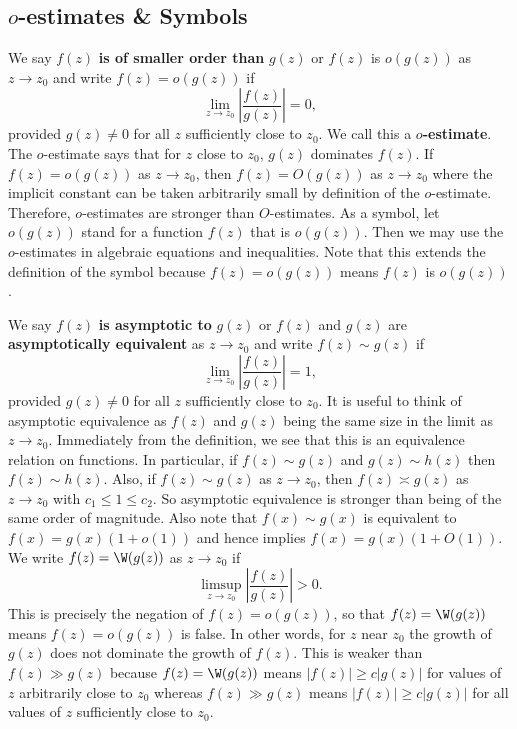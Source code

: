       \subsection*{\texorpdfstring{$o$}{o}-estimates \& Symbols}
        We say $f(z)$ \textbf{is of smaller order than} $g(z)$ or $f(z)$ is $o(g(z))$ as $z \to z_{0}$ and write $f(z) = o(g(z))$ if
        \[
          \lim_{z \to z_{0}}\left|\frac{f(z)}{g(z)}\right| = 0,
        \]
        provided $g(z) \neq 0$ for all $z$ sufficiently close to $z_{0}$. We call this a \textbf{$o$-estimate}. The $o$-estimate says that for $z$ close to $z_{0}$, $g(z)$ dominates $f(z)$. If $f(z) = o(g(z))$ as $z \to z_{0}$, then $f(z) = O(g(z))$ as $z \to z_{0}$ where the implicit constant can be taken arbitrarily small by definition of the $o$-estimate. Therefore, $o$-estimates are stronger than $O$-estimates. As a symbol, let $o(g(z))$ stand for a function $f(z)$ that is $o(g(z))$. Then we may use the $o$-estimates in algebraic equations and inequalities. Note that this extends the definition of the symbol because $f(z) = o(g(z))$ means $f(z)$ is $o(g(z))$.

        We say $f(z)$ \textbf{is asymptotic to} $g(z)$ or $f(z)$ and $g(z)$ are \textbf{asymptotically equivalent} as $z \to z_{0}$ and write $f(z) \sim g(z)$ if
        \[
          \lim_{z \to z_{0}}\left|\frac{f(z)}{g(z)}\right| = 1,
        \]
        provided $g(z) \neq 0$ for all $z$ sufficiently close to $z_{0}$. It is useful to think of asymptotic equivalence as $f(z)$ and $g(z)$ being the same size in the limit as $z \to z_{0}$. Immediately from the definition, we see that this is an equivalence relation on functions. In particular, if $f(z) \sim g(z)$ and $g(z) \sim h(z)$ then $f(z) \sim h(z)$. Also, if $f(z) \sim g(z)$ as $z \to z_{0}$, then $f(z) \asymp g(z)$ as $z \to z_{0}$ with $c_{1} \le 1 \le c_{2}$. So asymptotic equivalence is stronger than being of the same order of magnitude. Also note that $f(x) \sim g(x)$ is equivalent to $f(x) = g(x)(1+o(1))$ and hence implies $f(x) = g(x)(1+O(1))$. We write $f(z) = \W(g(z))$ as $z \to z_{0}$ if
        \[
          \limsup_{z \to z_{0}}\left|\frac{f(z)}{g(z)}\right| > 0.
        \]
        This is precisely the negation of $f(z) = o(g(z))$, so that $f(z) = \W(g(z))$ means $f(z) = o(g(z))$ is false. In other words, for $z$ near $z_{0}$ the growth of $g(z)$ does not dominate the growth of $f(z)$. This is weaker than $f(z) \gg g(z)$ because $f(z) = \W(g(z))$ means $|f(z)| \ge c|g(z)|$ for values of $z$ arbitrarily close to $z_{0}$ whereas $f(z) \gg g(z)$ means $|f(z)| \ge c|g(z)|$ for all values of $z$ sufficiently close to $z_{0}$.
